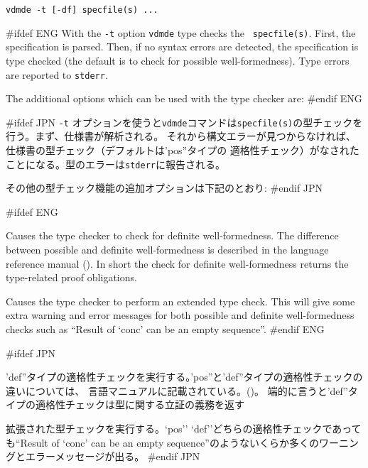 \documentclass[\pformat,12pt]{article}
\newcommand{\vdmde}{vdmde}
\newcommand{\vdmde}{vppde}
\newcommand{\aaa}{\tt }
\begin{document}
{\tt \vdmde\ -t [-df] specfile(s) ...}

\vspace{0.5cm}

\noindent
#ifdef ENG
With the {\tt -t} option {\tt \vdmde} type checks the {\tt
  specfile(s)}.  First, the specification is parsed. Then, if no syntax
errors are detected, the specification is type checked (the default
is to check for possible well-formedness). Type errors are reported to
{\aaa stderr}.

The additional options which can be used with the type checker are:
#endif ENG

#ifdef JPN
{\tt -t} オプションを使うと{\tt \vdmde}コマンドは{\tt specfile(s)}の型チェックを行う。まず、仕様書が解析される。
それから構文エラーが見つからなければ、仕様書の型チェック（デフォルトは'pos''タイプの
適格性チェック）がなされたことになる。型のエラーは{\aaa stderr}に報告される。

その他の型チェック機能の追加オプションは下記のとおり:
#endif JPN

\begin{description}
#ifdef ENG
\item[{\tt -d}] Causes the type checker to check for definite
  well-formedness.  The difference between possible and definite
  well-formedness is described in the language reference manual
  (). In 
  short the check for definite well-formedness returns the
  type-related proof obligations.
  
\item[{\tt -f}] Causes the type checker to perform an extended type
  check.  This will give some extra warning and error messages for
  both possible and definite well-formedness checks such as ``Result
  of `conc' can be an empty sequence''.
#endif ENG

#ifdef JPN
\item[{\tt -d}]
  'def''タイプの適格性チェックを実行する。'pos''と'def''タイプの適格性チェックの違いについては、
  言語マニュアルに記載されている。()。
  端的に言うと'def''タイプの適格性チェックは型に関する立証の義務を返す
  
\item[{\tt -f}]
  拡張された型チェックを実行する。`pos'' `def''どちらの適格性チェックであっても``Result of `conc' 
  can be an empty sequence''のようないくらか多くのワーニングとエラーメッセージが出る。
#endif JPN
\end{description}
\end{document}
